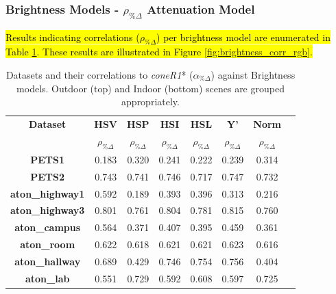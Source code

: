 \documentclass[12pt]{report}
\begin{document}
\subsubsection{Brightness Models - $\rho_{\%\Delta}$ Attenuation Model}

\hl{Results indicating correlations ($\rho_{\%\Delta}$) per brightness model are enumerated in Table \ref{table:brightness_corr_rgb}. These results are illustrated in Figure \ref{fig:brightness_corr_rgb}.}

\begin{table}
\centering
\begin{tabular}{ |c|c|c|c|c|c|c|c| }
	\hline
	\textbf{Dataset} & \textbf{HSV} & \textbf{HSP} & \textbf{HSI} & \textbf{HSL}& \textbf{Y'} & \textbf{Norm} \\
	\textbf{} & $\rho_{\%\Delta}$ & $\rho_{\%\Delta}$ & $\rho_{\%\Delta}$ & $\rho_{\%\Delta}$ & $\rho_{\%\Delta}$ & $\rho_{\%\Delta}$ \\
	\hline
	\hline
	\textbf{PETS1} & 0.183 & 0.320 & 0.241 & 0.222 & 0.239 & 0.314 \\
	\hline
	\textbf{PETS2} & 0.743 & 0.741 & 0.746 & 0.717 & 0.747 & 0.732 \\
	\hline
	\textbf{aton\_highway1} & 0.592 & 0.189 & 0.393 & 0.396 & 0.313 & 0.216 \\
	\hline
	\textbf{aton\_highway3} & 0.801 & 0.761 & 0.804 & 0.781 & 0.815 & 0.760 \\
	\hline
	\textbf{aton\_campus} & 0.564 & 0.371 & 0.407 & 0.395 & 0.459 & 0.361 \\
	\hline
	\hline
	\textbf{aton\_room} & 0.622 & 0.618 & 0.621 & 0.621 & 0.623 & 0.616 \\
	\hline
	\textbf{aton\_hallway} & 0.689 & 0.429 & 0.746 & 0.754 & 0.756 & 0.404 \\
	\hline
	\textbf{aton\_lab} & 0.551 & 0.729 & 0.592 & 0.608 & 0.597 & 0.725 \\
	\hline
\end{tabular}
\caption{Datasets and their correlations to \textit{coneR1}* ($\alpha_{\%\Delta}$) against Brightness models. Outdoor (top) and Indoor (bottom) scenes are grouped appropriately.}
\label{table:brightness_corr_rgb}
\end{table}
\end{document}
